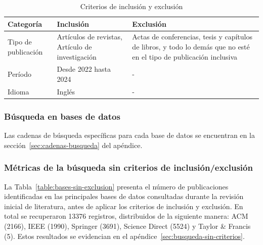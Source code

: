 \begin{table}[H]
	\centering
	\caption{Criterios de inclusión y exclusión}
	\fontsize{9pt}{10pt}\selectfont %
	\begin{tabular}{|p{3cm}|p{5cm}|p{6cm}|}
		\hline
		\textbf{Categoría}  & \textbf{Inclusión}         & \textbf{Exclusión}                                                                                                          \\
		\hline
		Tipo de publicación & Artículos de revistas, Artículo de investigación & Actas de conferencias, tesis y capítulos de libros, y todo lo demás que no esté en el tipo de publicación inclusiva \\
		\hline
		Período             & Desde 2022 hasta 2024      & -                                                                                                                           \\
		\hline
		Idioma              & Inglés                     & -                                                                                                                           \\
		\hline
	\end{tabular}
	\label{table:criterios-inclusión-exclusion}
\end{table}







\subsubsection{Búsqueda en bases de datos}\label{par:busquedaBasesDatos}
\noindent
Las cadenas de búsqueda específicas para cada base de datos se encuentran en la sección~\ref{sec:cadenas-busqueda} del apéndice.

\subsubsection{Métricas de la búsqueda sin criterios de inclusión/exclusión}\label{subsubsec:resumenBusqueda}
\noindent
La Tabla~\ref{table:bases-sin-exclusion} presenta el número de publicaciones identificadas en las principales bases de datos consultadas durante la revisión inicial de literatura, antes de aplicar los criterios de inclusión y exclusión. En total se recuperaron 13376 registros, distribuidos de la siguiente manera: ACM (2166), IEEE (1990), Springer (3691), Science Direct (5524) y Taylor \& Francis (5). Estos resultados se evidencian en el apéndice~\ref{sec:busqueda-sin-criterios}.

